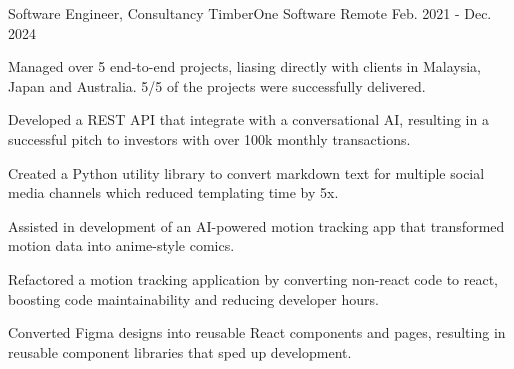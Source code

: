 

\begin{cventries}

  \cventry
    {Software Engineer, Consultancy} %
    {TimberOne Software} %
    {Remote} %
    {Feb. 2021 - Dec. 2024} %
    {
      \begin{cvitems} %
        \item {Managed over 5 end-to-end projects, liasing directly with clients in Malaysia, Japan and Australia. 5/5 of the projects were successfully delivered.}
        \item {Developed a REST API that integrate with a conversational AI, resulting in a successful pitch to investors with over 100k monthly transactions.}
        \item {Created a Python utility library to convert markdown text for multiple social media channels which reduced templating time by 5x.}
        \item {Assisted in development of an AI-powered motion tracking app that transformed motion data into anime-style comics.}
        \item {Refactored a motion tracking application by converting non-react code to react, boosting code maintainability and reducing developer hours.}
        \item {Converted Figma designs into reusable React components and pages, resulting in reusable component libraries that sped up development.}
      \end{cvitems}
    }


\end{cventries}
